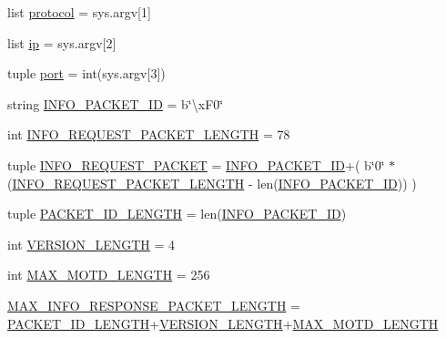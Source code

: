 \begin{DoxyCompactItemize}
\item 
list \hyperlink{namespacebootstrap__node__info_aafd839aa9fcaf8a9b730a927a5b3cd42}{protocol} = sys.\+argv\mbox{[}1\mbox{]}
\item 
list \hyperlink{namespacebootstrap__node__info_a1b9ac7d170b88df4c144ac2dd787f549}{ip} = sys.\+argv\mbox{[}2\mbox{]}
\item 
tuple \hyperlink{namespacebootstrap__node__info_a1aadf525515ecfcf662c2aa51a503763}{port} = int(sys.\+argv\mbox{[}3\mbox{]})
\item 
string \hyperlink{namespacebootstrap__node__info_a373a7c74e1ddad3646d66e0b422a7c5c}{I\+N\+F\+O\+\_\+\+P\+A\+C\+K\+E\+T\+\_\+\+I\+D} = b\char`\"{}\textbackslash{}x\+F0\char`\"{}
\item 
int \hyperlink{namespacebootstrap__node__info_a0385beb9b50ea35fdcedaa0939c5f117}{I\+N\+F\+O\+\_\+\+R\+E\+Q\+U\+E\+S\+T\+\_\+\+P\+A\+C\+K\+E\+T\+\_\+\+L\+E\+N\+G\+T\+H} = 78
\item 
tuple \hyperlink{namespacebootstrap__node__info_ac4d23932ded1b11f1b439d0f6311b728}{I\+N\+F\+O\+\_\+\+R\+E\+Q\+U\+E\+S\+T\+\_\+\+P\+A\+C\+K\+E\+T} = \hyperlink{namespacebootstrap__node__info_a373a7c74e1ddad3646d66e0b422a7c5c}{I\+N\+F\+O\+\_\+\+P\+A\+C\+K\+E\+T\+\_\+\+I\+D}+( b\char`\"{}0\char`\"{} $\ast$ (\hyperlink{namespacebootstrap__node__info_a0385beb9b50ea35fdcedaa0939c5f117}{I\+N\+F\+O\+\_\+\+R\+E\+Q\+U\+E\+S\+T\+\_\+\+P\+A\+C\+K\+E\+T\+\_\+\+L\+E\+N\+G\+T\+H} -\/ len(\hyperlink{namespacebootstrap__node__info_a373a7c74e1ddad3646d66e0b422a7c5c}{I\+N\+F\+O\+\_\+\+P\+A\+C\+K\+E\+T\+\_\+\+I\+D})) )
\item 
tuple \hyperlink{namespacebootstrap__node__info_a83d59726f57beca9201bbb3a5a180ac4}{P\+A\+C\+K\+E\+T\+\_\+\+I\+D\+\_\+\+L\+E\+N\+G\+T\+H} = len(\hyperlink{namespacebootstrap__node__info_a373a7c74e1ddad3646d66e0b422a7c5c}{I\+N\+F\+O\+\_\+\+P\+A\+C\+K\+E\+T\+\_\+\+I\+D})
\item 
int \hyperlink{namespacebootstrap__node__info_a2bd90f1deb0ecd828b4d7ebfc8a1dd18}{V\+E\+R\+S\+I\+O\+N\+\_\+\+L\+E\+N\+G\+T\+H} = 4
\item 
int \hyperlink{namespacebootstrap__node__info_ad6b8ae0e681eae70c4d0472e3a2ebaf6}{M\+A\+X\+\_\+\+M\+O\+T\+D\+\_\+\+L\+E\+N\+G\+T\+H} = 256
\item 
\hyperlink{namespacebootstrap__node__info_a08409b37ead33c8a7f759bce4606c6e3}{M\+A\+X\+\_\+\+I\+N\+F\+O\+\_\+\+R\+E\+S\+P\+O\+N\+S\+E\+\_\+\+P\+A\+C\+K\+E\+T\+\_\+\+L\+E\+N\+G\+T\+H} = \hyperlink{namespacebootstrap__node__info_a83d59726f57beca9201bbb3a5a180ac4}{P\+A\+C\+K\+E\+T\+\_\+\+I\+D\+\_\+\+L\+E\+N\+G\+T\+H}+\hyperlink{namespacebootstrap__node__info_a2bd90f1deb0ecd828b4d7ebfc8a1dd18}{V\+E\+R\+S\+I\+O\+N\+\_\+\+L\+E\+N\+G\+T\+H}+\hyperlink{namespacebootstrap__node__info_ad6b8ae0e681eae70c4d0472e3a2ebaf6}{M\+A\+X\+\_\+\+M\+O\+T\+D\+\_\+\+L\+E\+N\+G\+T\+H}

\end{DoxyCompactItemize}
